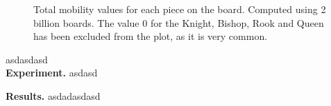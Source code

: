 \begin{itemize}
\begin{figure}[H]
\centering
{}
\caption{Total mobility values for each piece on the board. Computed using 2 billion boards. The value 0 for the Knight, Bishop, Rook and Queen has been excluded from the plot, as it is very common.}
\end{figure}

\end{itemize}

asdasdasd \\

\textbf{Experiment.} asdasd

\textbf{Results.} asdadasdasd
